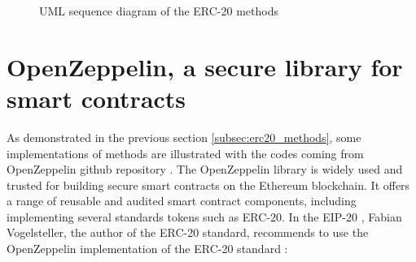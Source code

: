 \begin{figure}[!h]
    \caption{UML sequence diagram of the ERC-20 methods}
    \label{fig:uml_erc20_methods}
\end{figure}



\section{OpenZeppelin, a secure library for smart contracts}
\label{sec:ch2_openzeppelin}

As demonstrated in the previous section \ref{subsec:erc20_methods}, some implementations of methods are illustrated with the codes coming from OpenZeppelin github repository \cite{openzeppelin_github}. The
OpenZeppelin library is widely used and trusted for building secure smart contracts on the Ethereum blockchain. It offers a range of reusable and audited smart contract components, including
implementing several standards tokens such as ERC-20. In the EIP-20 \cite{eth_erc20}, Fabian Vogelsteller, the author of the ERC-20 standard, recommends to use the OpenZeppelin implementation of the ERC-20 standard
\cite{openzeppelin_erc20}:

